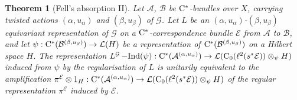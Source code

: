 \documentclass[11 pt, leqno]{amsart}
\numberwithin{equation}{section}
\theoremstyle{plain}
\newtheorem{thm}{Theorem}[section]
\theoremstyle{definition}
\newcommand*{\contz}{\mathrm{C_0}}%
\DeclareMathOperator{\dashind}{-Ind}
\newcommand{\B}{\mathcal B}
\newcommand{\LL}{\mathcal L}
\newcommand{\G}{\mathcal G} %
\newcommand{\EE}{\mathcal E}
\newcommand{\A}{\mathcal A}
\newcommand{\cst}{\ifmmode\mathrm{C}^*\else{$\mathrm{C}^*$}\fi}
\begin{document}
\begin{thm}[Fell's absorption II]\label{thm:Fell_absorption II}
Let $\A$, $\B$ be $\cst$-bundles over $X$, carrying twisted actions $(\alpha,u_\alpha)$ and $(\beta,u_\beta)$ of $\G$. 
Let $L$ be an $(\alpha,u_{\alpha})$-$(\beta,u_{\beta})$ equivariant representation of $\G$ on a $\cst$-correspondence bundle $\EE$ from $\A$ to $\B$, and let $\psi : \cst( \B^{(\beta,u_{\beta})} ) \to \LL(H)$ be a representation of $\cst(\B^{(\beta,u_{\beta})})$ on a Hilbert space $H$.
The representation $L^{\G}\dashind(\psi) : \cst( \A^{(\alpha,u_{\alpha})} ) \to \LL(\contz(\ell^2(s^*\EE))\otimes_{\psi} H)$ induced from $\psi$ by the regularisation of $L$ is unitarily equivalent to the amplification $\pi^{\EE}\otimes 1_{H} : \cst(\A^{(\alpha,u_{\alpha})}) \to \LL(\contz(\ell^2(s^*\EE)) \otimes_{\psi} H)$ of the regular representation $\pi^{\EE}$ induced by $\EE$. 
\end{thm}
\end{document}

